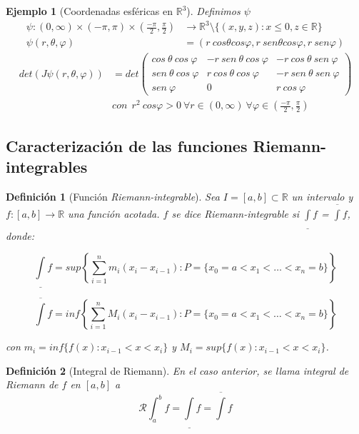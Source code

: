 \documentclass[11pt, a4paper]{article}
\newif\IfInSansMode
\newcommand{\R}{\mathbb{R}} \newcommand{\N}{\mathbb{N}}
\theoremstyle{theorem-style}
\theoremstyle{definition-style}
\newtheorem{ndef}{Definición}[section]
\theoremstyle{remark-style}
\theoremstyle{example-style}
\newtheorem{ejemplo}{Ejemplo}[section]
\begin{document}
\begin{ejemplo}[Coordenadas esféricas en $\R^3$]
  Definimos $\psi$
\begin{align*}
  \psi : (0, \infty) \times (-\pi, \pi) \times \left( \frac{-\pi}{2},
  \frac{\pi}{2} \right)
&\rightarrow \R^3 \setminus \{(x, y, z) : x \leq 0, z \in \R \} \\
\psi(r, \theta, \varphi) &= (r \ cos \theta cos \varphi, r \ sen \theta cos
                           \varphi, r \ sen \varphi )
\end{align*}
\begin{align*}det(J \psi (r, \theta, \varphi)) &= det
\begin{pmatrix}
  cos \ \theta \ cos \ \varphi & -r \ sen \ \theta \ cos \ \varphi & -r \ cos \ \theta \ sen \ \varphi \\
  sen \ \theta \ cos \ \varphi  & r \ cos \ \theta \ cos \ \varphi & -r \ sen \ \theta \ sen \ \varphi \\
  sen \ \varphi  & 0 & r \
  cos \ \varphi
\end{pmatrix} \\
  &con \ \ r^2 \ cos \varphi > 0 \ \forall r \in (0, \infty) \ \forall \varphi \in \left( \frac{-\pi}{2}, \frac{\pi}{2} \right)
\end{align*}
\end{ejemplo}

\subsection{Caracterización de las funciones Riemann-integrables}
\label{sub:caracterizaci_n_de_las_funciones_riemann_integrables}

\begin{ndef}[Función \textit{Riemann-integrable}]
    Sea $I = [a, b] \subset \R$ un intervalo y $f : [a, b] \rightarrow \R$ una función acotada. $f$ se dice \textit{Riemann-integrable} si $\underline {\int}f$ = $\overline {\int}f$, donde:

    $$\underline {\int}f = sup \left \{ \sum_{i=1}^{n} m_i(x_i - x_{i-1}) : P = \{ x_0 = a < x_1 < \hdots < x_n = b \} \right \}$$

    $$\overline {\int}f = inf \left \{ \sum_{i=1}^{n} M_i(x_i - x_{i-1}) : P = \{ x_0 = a < x_1 < \hdots < x_n = b \} \right \}$$

    con $m_i = inf \{ f(x) : x_{i-1} < x < x_i \}$ y $M_i = sup \{ f(x) : x_{i-1} < x < x_i \}$. 
\end{ndef}

\begin{ndef}[Integral de Riemann]
    En el caso anterior, se llama \textit{integral de Riemann} de $f$ en $[a, b]$ a $$ \mathcal R \int_{a}^{b} f = \underline{\int}f = \overline{\int}f$$
\end{ndef}
\end{document}
